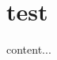 \documentclass[t]{beamer}
\begin{document}
\section{test}
\begin{frame}
content...
\end{frame}
\end{document}
